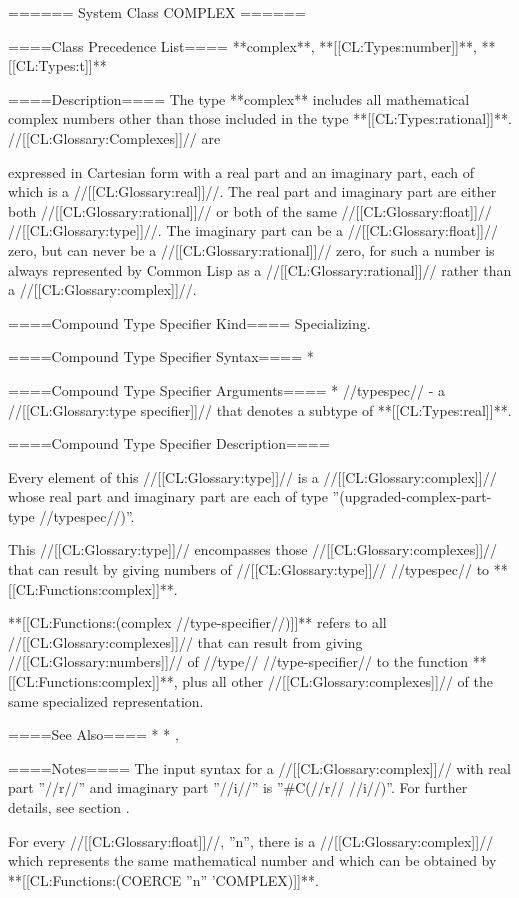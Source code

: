 ====== System Class COMPLEX ======

====Class Precedence List==== 
**complex**, **[[CL:Types:number]]**, **[[CL:Types:t]]**

====Description====
The type **complex** includes all mathematical complex numbers other than those included in the type **[[CL:Types:rational]]**. //[[CL:Glossary:Complexes]]// are

expressed in Cartesian form with a real part and an imaginary part, each of which is a //[[CL:Glossary:real]]//. The real part and imaginary part are either both //[[CL:Glossary:rational]]// or both of the same //[[CL:Glossary:float]]// //[[CL:Glossary:type]]//. The imaginary part can be a //[[CL:Glossary:float]]// zero, but can never be a //[[CL:Glossary:rational]]// zero, for such a number is always represented by Common Lisp as a //[[CL:Glossary:rational]]// rather than a //[[CL:Glossary:complex]]//.

====Compound Type Specifier Kind====
Specializing.

====Compound Type Specifier Syntax====
  * 

====Compound Type Specifier Arguments====
  * //typespec// - a //[[CL:Glossary:type specifier]]// that denotes a subtype of **[[CL:Types:real]]**.

====Compound Type Specifier Description====

Every element of this //[[CL:Glossary:type]]// is a //[[CL:Glossary:complex]]// whose real part and imaginary part are each of type ''(upgraded-complex-part-type //typespec//)''.

This //[[CL:Glossary:type]]// encompasses those //[[CL:Glossary:complexes]]// that can result by giving numbers of //[[CL:Glossary:type]]// //typespec// to **[[CL:Functions:complex]]**.

**[[CL:Functions:(complex //type-specifier//)]]** refers to all //[[CL:Glossary:complexes]]// that can result from giving //[[CL:Glossary:numbers]]// of //type// //type-specifier// to the function **[[CL:Functions:complex]]**, plus all other //[[CL:Glossary:complexes]]// of the same specialized representation.

====See Also====
  * {\secref\RuleOfCanonRepForComplexRationals}
  * {\secref\NumsFromTokens}, {\secref\PrintingComplexes}

====Notes====
The input syntax for a //[[CL:Glossary:complex]]// with real part ''//r//'' and imaginary part ''//i//'' is ''#C(//r// //i//)''. For further details, see section {\secref\StandardMacroChars}.

For every //[[CL:Glossary:float]]//, ''n'', there is a //[[CL:Glossary:complex]]// which represents the same mathematical number and which can be obtained by **[[CL:Functions:(COERCE ''n'' 'COMPLEX)]]**.

 
